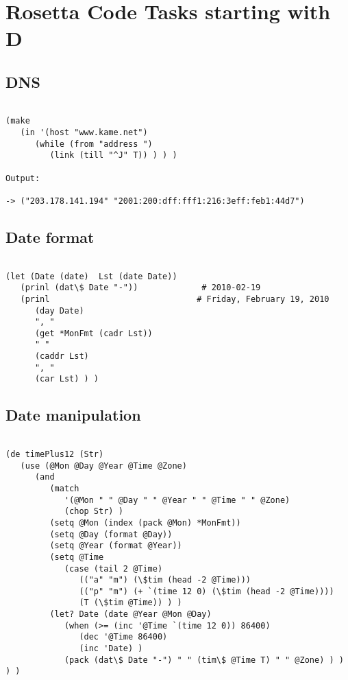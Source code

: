 \chapter{Rosetta Code Tasks starting with D}

\section*{DNS}

\begin{verbatim}

(make
   (in '(host "www.kame.net")
      (while (from "address ")
         (link (till "^J" T)) ) ) )

Output:

-> ("203.178.141.194" "2001:200:dff:fff1:216:3eff:feb1:44d7")

\end{verbatim}

\section*{Date format}

\begin{verbatim}

(let (Date (date)  Lst (date Date))
   (prinl (dat\$ Date "-"))             # 2010-02-19
   (prinl                              # Friday, February 19, 2010
      (day Date)
      ", "
      (get *MonFmt (cadr Lst))
      " "
      (caddr Lst)
      ", "
      (car Lst) ) )

\end{verbatim}

\section*{Date manipulation}

\begin{verbatim}

(de timePlus12 (Str)
   (use (@Mon @Day @Year @Time @Zone)
      (and
         (match
            '(@Mon " " @Day " " @Year " " @Time " " @Zone)
            (chop Str) )
         (setq @Mon (index (pack @Mon) *MonFmt))
         (setq @Day (format @Day))
         (setq @Year (format @Year))
         (setq @Time
            (case (tail 2 @Time)
               (("a" "m") (\$tim (head -2 @Time)))
               (("p" "m") (+ `(time 12 0) (\$tim (head -2 @Time))))
               (T (\$tim @Time)) ) )
         (let? Date (date @Year @Mon @Day)
            (when (>= (inc '@Time `(time 12 0)) 86400)
               (dec '@Time 86400)
               (inc 'Date) )
            (pack (dat\$ Date "-") " " (tim\$ @Time T) " " @Zone) ) ) ) )

\end{verbatim}

